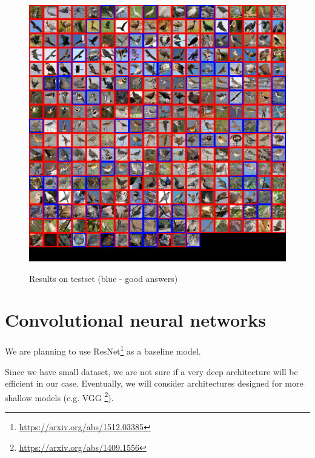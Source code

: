 ﻿\documentclass[a4paper]{article}
\begin{document}
\begin{figure}[h]
    \caption[]{Results on testset (blue - good answers)}
    \centering
    \includegraphics[page=2,width=1.0\textwidth]{eval.png}
    \label{fig:eval}
\end{figure}

\section{Convolutional neural networks}
We are planning to use {ResNet}\footnote{\url{https://arxiv.org/abs/1512.03385}}
as a baseline model.

Since we have small dataset, we are not sure if a very deep architecture
will be efficient in our case.
Eventually, we will consider architectures designed
for more shallow models (e.g. VGG \footnote{\url{https://arxiv.org/abs/1409.1556}}).
\end{document}
